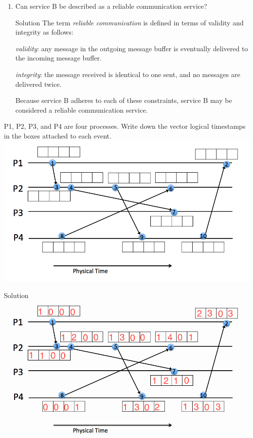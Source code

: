 \documentclass{article}
\begin{document}
\begin{spacing}{1.1}
\begin{homeworkProblem}
\begin{enumerate}[(1)]
\begin{homeworkSection}{Solution}
			\end{homeworkSection}
		\item Can service B be described as a reliable communication service?
			\begin{homeworkSection}{Solution}
				The term \emph{ reliable communication} is defined in terms of validity and integrity as follows: 
				
				\emph{validity}: any message in the outgoing message buffer is eventually delivered to the incoming message buffer.
				
				\emph{integrity}: the message received is identical to one sent, and no messages are delivered twice.
				
				Because service B adheres to each of these constraints, service B may be considered a reliable communication service.
			\end{homeworkSection}
	\end{enumerate}
\end{homeworkProblem}
\newpage	
\begin{homeworkProblem}
	P1, P2, P3, and P4 are four processes. Write down the vector logical timestamps in the boxes attached to each event.
	\\ \includegraphics[width=\linewidth]{prob3.png}
	\begin{homeworkSection}{Solution}
		\includegraphics[width=\linewidth]{prob3ans.png}

\end{homeworkSection}
\end{homeworkProblem}
\end{spacing}
\end{document}
